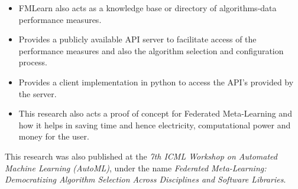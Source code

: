 \begin{itemize}
    \item FMLearn also acts as a knowledge base or directory of algorithms-data performance measures.
    \item Provides a publicly available API server to facilitate access of the performance measures and also the algorithm selection and configuration process.
    \item Provides a client implementation in python to access the API's provided by the server.
    \item This research also acts a proof of concept for Federated Meta-Learning and how it helps in saving time and hence electricity, computational power and money for the user.
\end{itemize}

This research was also published at the \textit{7th ICML Workshop on Automated Machine Learning (AutoML)}, under the name \textit{Federated Meta-Learning: Democratizing Algorithm Selection Across Disciplines and Software Libraries}.
